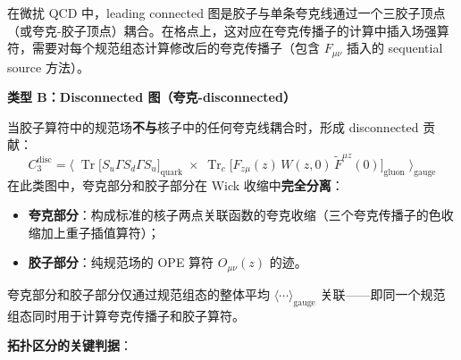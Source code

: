 \documentclass[11pt,a4paper]{ctexart}
\newcommand{\tr}{\operatorname{Tr}}
\begin{document}
在微扰 QCD 中，leading connected 图是胶子与单条夸克线通过一个三胶子顶点（或夸克-胶子顶点）耦合。在格点上，这对应在夸克传播子的计算中插入场强算符，需要对每个规范组态计算修改后的夸克传播子（包含 $F_{\mu\nu}$ 插入的 sequential source 方法）。

\textbf{类型 B：Disconnected 图（夸克-disconnected）}

当胶子算符中的规范场\textbf{不与}核子中的任何夸克线耦合时，形成 disconnected 贡献：
\begin{equation}\label{eq:disconnected}
C_3^{\text{disc}} = \big\langle\;
\tr\big[ S_u \Gamma S_d \Gamma S_u \big]_{\text{quark}}
\;\times\;
\tr_c\big[ F_{z\mu}(z) \, W(z,0) \, \tilde{F}^{\mu z}(0) \big]_{\text{gluon}}
\;\big\rangle_{\text{gauge}}
\end{equation}
在此类图中，夸克部分和胶子部分在 Wick 收缩中\textbf{完全分离}：
\begin{itemize}
  \item \textbf{夸克部分}：构成标准的核子两点关联函数的夸克收缩（三个夸克传播子的色收缩加上重子插值算符）；
  \item \textbf{胶子部分}：纯规范场的 OPE 算符 $O_{\mu\nu}(z)$ 的迹。
\end{itemize}
夸克部分和胶子部分仅通过规范组态的整体平均 $\langle\cdots\rangle_{\text{gauge}}$ 关联——即同一个规范组态同时用于计算夸克传播子和胶子算符。

\textbf{拓扑区分的关键判据}：
\begin{center}
\end{center}
\end{document}
